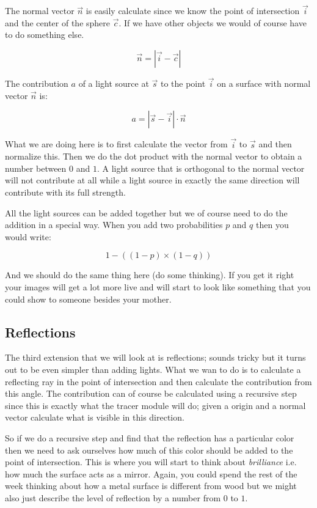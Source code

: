 \documentclass[a4paper,11pt]{article}
\begin{document}
The normal vector $\vec{n}$ is easily calculate since we know the point
of intersection $\vec{i}$ and the center of the sphere $\vec{c}$. If
we have other objects we would of course have to do something else.

$$ \vec{n} = |\vec{i} - \vec{c}| $$

The contribution $a$ of a light source at $\vec{s}$ to the point
$\vec{i}$ on a surface with normal vector $\vec{n}$ is:

$$a =  |\vec{s} - \vec{i}| \cdot \vec{n}$$

What we are doing here is to first calculate the vector from $\vec{i}$
to $\vec{s}$ and then normalize this. Then we do the dot product with
the normal vector to obtain a number between $0$ and $1$.  A light
source that is orthogonal to the normal vector will not contribute at
all while a light source in exactly the same direction will contribute
with its full strength.

All the light sources can be added together but we of course need to
do the addition in a special way. When you add two probabilities $p$
and $q$ then you would write:

$$ 1 - ((1-p) \times (1-q))$$

And we should do the same thing here (do some thinking). If you get it
right your images will get a lot more live and will start to look like
something that you could show to someone besides your mother.

\subsection*{Reflections}

The third extension that we will look at is reflections; sounds tricky
but it turns out to be even simpler than adding lights. What we wan to
do is to calculate a reflecting ray in the point of intersection and
then calculate the contribution from this angle. The contribution can
of course be calculated using a recursive step since this is exactly
what the tracer module will do; given a origin and a normal vector
calculate what is visible in this direction. 

So if we do a recursive step and find that the reflection has a
particular color then we need to ask ourselves how much of this color
should be added to the point of intersection. This is where you will
start to think about {\em brilliance} i.e. how much the surface acts as
a mirror. Again, you could spend the rest of the week thinking about
how a metal surface is different from wood but we might also just
describe the level of reflection by a number from $0$ to $1$.
\end{document}

